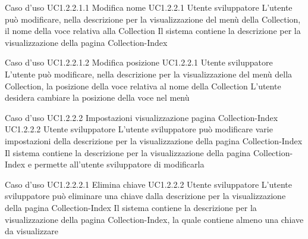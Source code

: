 \UCtitle
{Caso d'uso UC1.2.2.1.1}
{Modifica nome}
\UC
{UC1.2.2.1}
{Utente sviluppatore}
{L'utente può modificare, nella descrizione per la visualizzazione del menù della Collection, il nome della voce relativa alla Collection}
{Il sistema contiene la descrizione per la visualizzazione della pagina Collection-Index}

\UCtitle
{Caso d'uso UC1.2.2.1.2}
{Modifica posizione}
\UC
{UC1.2.2.1}
{Utente sviluppatore}
{L'utente può modificare, nella descrizione per la visualizzazione del menù della Collection, la posizione della voce relativa al nome della Collection}
{L'utente desidera cambiare la posizione della voce nel menù}



\UCtitle
{Caso d'uso UC1.2.2.2}
{Impostazioni visualizzazione pagina Collection-Index}
\UC
{UC1.2.2.2}
{Utente sviluppatore}
{L'utente sviluppatore  può modificare varie impostazioni della descrizione per la visualizzazione della pagina Collection-Index}
{Il sistema contiene la descrizione per la visualizzazione della pagina Collection-Index e permette all'utente sviluppatore di modificarla}

\UCtitle
{Caso d'uso UC1.2.2.2.1}
{Elimina chiave}
\UC
{UC1.2.2.2}
{Utente sviluppatore}
{L'utente sviluppatore  può eliminare una chiave dalla descrizione per la visualizzazione della pagina Collection-Index}
{Il sistema contiene la descrizione per la visualizzazione della pagina Collection-Index, la quale contiene almeno una chiave da visualizzare}


